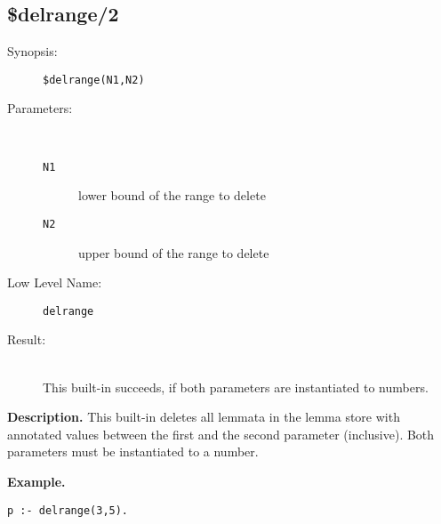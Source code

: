 %
%
%
\subsection{\$delrange/2}

\begin{description}
\item[Synopsis:]
	{\tt \$delrange(N1,N2)}
\item[Parameters:]\ \\[-0.5cm]
	\begin{description}
	\item[{\tt N1}]
lower bound of the range to delete
	\item[{\tt N2}]
upper bound of the range to delete
	\end{description}
\item[Low Level Name:]
	{\tt delrange}
\item[Result:]\ \\
This built-in succeeds, if both parameters are
instantiated to numbers.

\end{description}

\vspace*{0.5cm}
\noindent
{\bf Description.}
This built-in deletes all lemmata in the lemma store
with annotated values between the first and the second parameter
(inclusive).
Both parameters must be instantiated to a number.
 
\vspace*{0.5cm}
\noindent
{\bf Example.}
\begin{verbatim}
p :- delrange(3,5).
\end{verbatim}


